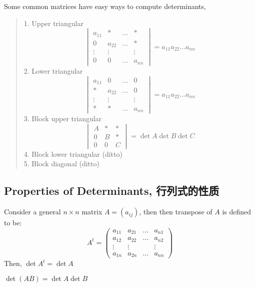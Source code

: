 Some common matrices have easy ways to compute determinants,
\begin{quote}
    1. Upper triangular
    $$\begin{vmatrix}
        a_{11} & * & \dots & * \\
        0 & a_{22} & \dots & * \\
        \vdots & \vdots & & \vdots \\
        0 & 0 & \dots & a_{nn}
    \end{vmatrix} = a_{11}a_{22}\dots a_{nn}$$
    2. Lower triangular
    $$\begin{vmatrix}
        a_{11} & 0 & \dots & 0 \\
        * & a_{22} & \dots & 0 \\
        \vdots & \vdots & & \vdots \\
        * & * & \dots & a_{nn}
    \end{vmatrix} = a_{11}a_{22}\dots a_{nn}$$
    3. Block upper triangular
    $$\begin{vmatrix}
        A & * & * \\
        0 & B & * \\
        0 & 0 & C
    \end{vmatrix} = \det A \det B \det C$$
    4. Block lower triangular (ditto) \\
    5. Block diagonal (ditto)
\end{quote}

\subsection{Properties of Determinants, 行列式的性质}
\begin{definition}
    Consider a general $n \times n$ matrix $A = (a_{ij})$, then then transpose of $A$ is defined to be:
    $$A^t = \begin{pmatrix}
        a_{11} & a_{21} & \dots & a_{n1} \\
        a_{12} & a_{22} & \dots & a_{n2} \\
        \vdots & \vdots & & \vdots \\
        a_{1n} & a_{2n} & \dots & a_{nn}
    \end{pmatrix}$$
    Then, $\det A^t = \det A$
\end{definition}
\begin{proposition}
    $\det (AB) = \det A \det B$
\end{proposition}

